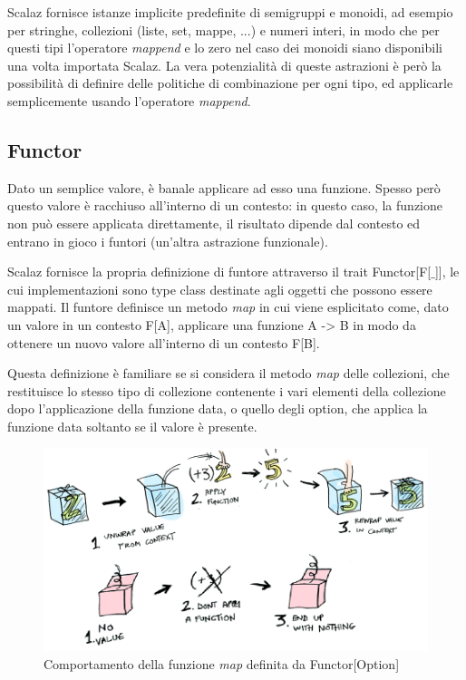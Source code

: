 Scalaz fornisce istanze implicite predefinite di semigruppi e monoidi, ad esempio per stringhe, collezioni (liste, set, mappe, ...) e numeri interi, in modo che per questi tipi l'operatore \textit{mappend} e lo zero nel caso dei monoidi siano disponibili una volta importata Scalaz. La vera potenzialità di queste astrazioni è però la possibilità di definire delle politiche di combinazione per ogni tipo, ed applicarle semplicemente usando l'operatore \textit{mappend}.



\subsection{Functor}

Dato un semplice valore, è banale applicare ad esso una funzione. Spesso però questo valore è racchiuso all'interno di un contesto: in questo caso, la funzione non può essere applicata direttamente, il risultato dipende dal contesto ed entrano in gioco i funtori (un'altra astrazione funzionale).

Scalaz fornisce la propria definizione di funtore attraverso il trait Functor[F[$\_$]], le cui implementazioni sono type class destinate agli oggetti che possono essere mappati. Il funtore definisce un metodo \textit{map} in cui viene esplicitato come, dato un valore in un contesto F[A], applicare una funzione A -> B in modo da ottenere un nuovo valore all'interno di un contesto F[B].

Questa definizione è familiare se si considera il metodo \textit{map} delle collezioni, che restituisce lo stesso tipo di collezione contenente i vari elementi della collezione dopo l'applicazione della funzione data, o quello degli option, che applica la funzione data soltanto se il valore è presente.

\begin{figure}[th]
\centering
\includegraphics[scale=0.65]{images/functor}
\decoRule
\caption[functor]{Comportamento della funzione \textit{map} definita da Functor[Option] \cite{FunctorsApplicativesMonads}}
\end{figure}

